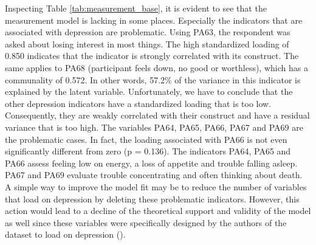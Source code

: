 \documentclass[11pt]{article}
\begin{document}
Inspecting Table \ref{tab:measurement_base}, it is evident to see that the
measurement model is lacking in some places. Especially the indicators that are
associated with depression are problematic.
Using PA63, the respondent was asked about losing interest in most things. The
high standardized loading of 0.850 indicates that the indicator is strongly
correlated with its construct. The same applies to PA68 (participant feels down,
no good or worthless), which has a communality of 0.572. In other words, 57.2\%
of the variance in this indicator is explained by the latent variable.
Unfortunately, we have to conclude that the other depression indicators have a
standardized loading that is too low. Consequently, they are weakly correlated
with their construct and have a residual variance that is too high. 
The variables PA64, PA65, PA66, PA67 and PA69 are the problematic cases. In
fact, the loading associated with PA66 is not even significantly different from
zero (p = 0.136). The indicators PA64, PA65 and PA66 assess feeling low on
energy, a loss of appetite and trouble falling asleep. PA67 and PA69 evaluate
trouble concentrating and often thinking about death. A simple way to improve
the model fit may be to reduce the number of variables that load on depression
by deleting these problematic indicators. However, this action would lead to a
decline of the theoretical support and validity of the model as well since these
variables were specifically designed by the authors of the dataset to load on
depression (\cite{hair2010}).
\end{document}
